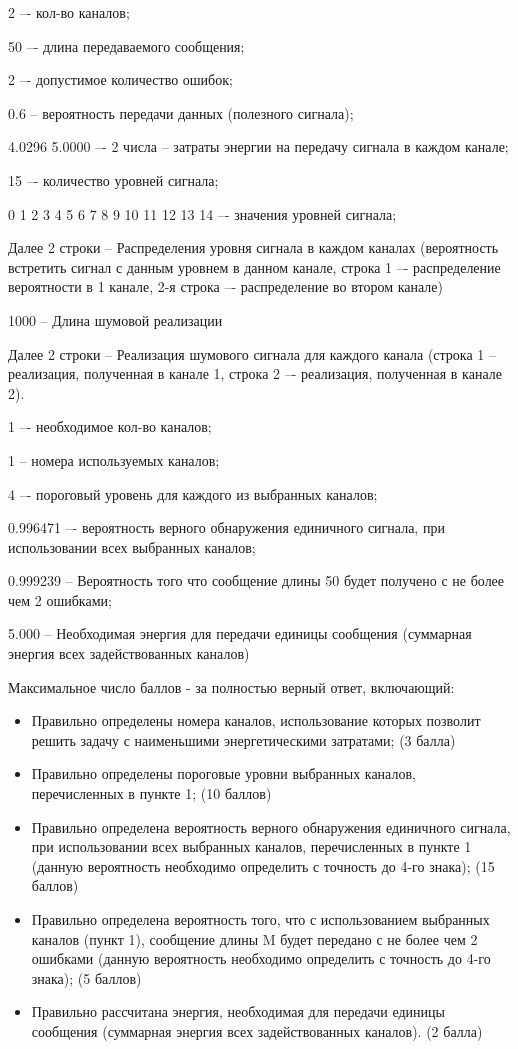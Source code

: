 
2 –- кол-во каналов;

50 –- длина передаваемого сообщения;

2 –- допустимое количество ошибок;

0.6 -- вероятность передачи данных (полезного сигнала);

4.0296 5.0000 –- 2 числа -- затраты энергии на передачу сигнала в каждом канале;

15 –- количество уровней сигнала;

0 1 2 3 4 5 6 7 8 9 10 11 12 13 14 –- значения уровней сигнала;

Далее 2 строки -- Распределения уровня сигнала в каждом каналах (вероятность встретить сигнал с данным уровнем в данном канале, строка 1 –- распределение вероятности в 1 канале, 2-я строка –- распределение во втором канале)

1000 -- Длина шумовой реализации

Далее 2 строки -- Реализация шумового сигнала для каждого канала (строка 1 -- реализация, полученная в канале 1, строка 2 –- реализация, полученная в канале 2).


\outputfmtSection

1 –- необходимое кол-во каналов;

1 -- номера используемых каналов;

4 –- пороговый уровень для каждого из выбранных каналов;

0.996471 –- вероятность верного обнаружения единичного сигнала, при использовании всех выбранных каналов;

0.999239 -- Вероятность того что сообщение длины 50 будет получено с не более чем 2 ошибками;

5.000 -- Необходимая энергия для передачи единицы сообщения (суммарная энергия всех задействованных каналов)

\markSection

Максимальное число баллов - за полностью верный ответ, включающий:

\begin{itemize}
    \item Правильно определены номера каналов, использование которых позволит решить задачу с наименьшими энергетическими затратами; (3 балла)
    \item Правильно определены пороговые уровни выбранных каналов, перечисленных в пункте 1; (10 баллов)
    \item Правильно определена вероятность верного обнаружения единичного сигнала, при использовании всех выбранных каналов, перечисленных в пункте 1 (данную вероятность необходимо определить с точность до 4-го знака); (15 баллов)
    \item Правильно определена вероятность того, что с использованием выбранных каналов (пункт 1), сообщение длины M будет передано с не более чем 2 ошибками (данную вероятность необходимо определить с точность до 4-го знака); (5 баллов)
    \item Правильно рассчитана энергия, необходимая для передачи единицы сообщения (суммарная энергия всех задействованных каналов). (2 балла)
\end{itemize}

